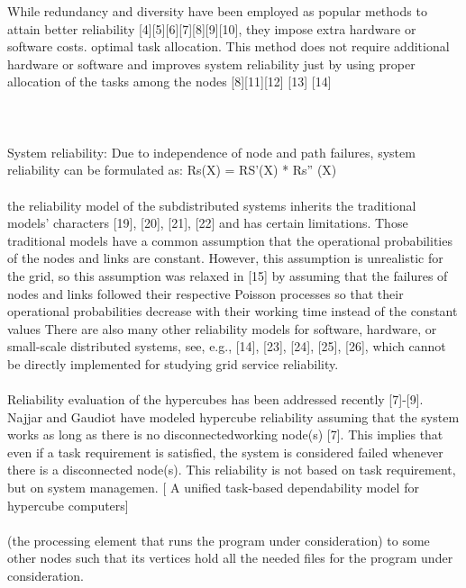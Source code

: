 \documentclass{cslthse-msc}
\begin{document}
\iffalse
While redundancy and diversity have been employed as popular methods to attain better reliability [4][5][6][7][8][9][10], they impose extra hardware or software costs.
optimal task allocation. This method does not require additional hardware or software and improves system reliability just by using proper allocation of the tasks among the nodes [8][11][12] [13] [14] \cite{optTaskAllocationForMaxRel}
\\\\
\cite{discContRelModel}
\\\\
System reliability: Due to independence of node and path failures, system reliability can be formulated as: Rs(X) = RS’(X) * Rs” (X) \cite{optTaskAllocationForMaxRel}
\\\\
the reliability model of the subdistributed systems inherits the traditional models’ characters [19], [20], [21], [22] and has certain limitations. Those traditional models have a common assumption that the operational probabilities of the nodes and links are constant. However, this assumption is unrealistic for the grid, so this assumption was relaxed in [15] by assuming that the failures of nodes and links followed their respective Poisson processes so that their operational probabilities decrease with their working time instead of the constant values 
There are also many other reliability models for software, hardware, or small-scale distributed systems, see, e.g., [14], [23], [24], [25], [26], which cannot be directly implemented for studying grid service reliability. \cite{hierarchicalRelModeling}
\\\\
Reliability evaluation of the hypercubes has been addressed recently [7]-[9]. Najjar and Gaudiot have modeled hypercube reliability assuming that the system works as long as there is no disconnectedworking node(s) [7]. This implies that even if a task requirement is satisfied, the system is considered failed whenever there is a disconnected node(s). This reliability is not based on task requirement, but on system managemen.  [ A unified task-based dependability model for hypercube computers]
\\\\
(the processing element that runs the program under consideration) to some other nodes such that its vertices hold all the needed files for the program under consideration. \cite{relAnalysisFRA}
\\\\
\end{document}
